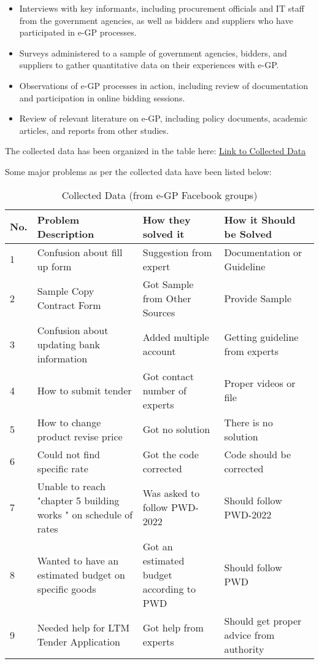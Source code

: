 \documentclass{report}
\begin{document}
\begin{itemize}
    \item Interviews with key informants, including procurement officials and IT staff from the government agencies, as well as bidders and suppliers who have participated in e-GP processes.
    \item Surveys administered to a sample of government agencies, bidders, and suppliers to gather quantitative data on their experiences with e-GP.
    \item Observations of e-GP processes in action, including review of documentation and participation in online bidding sessions.
    \item Review of relevant literature on e-GP, including policy documents, academic articles, and reports from other studies.
\end{itemize}

The collected data has been organized in the table here: 
\href{https://buetedu-my.sharepoint.com/:w:/g/personal/1805118_cse_buet_ac_bd/EYUHmMrHhEhNkSV2H3Ck-2oBmAqpOcPk1AerYMGOfzdDQw?e=oOpmhX}{Link to Collected Data}

Some major problems as per the collected data have been listed below:

\begin{table}[h]
\caption{Collected Data (from e-GP Facebook groups)}
\centering
\begin{tabularx}{\textwidth}{|p{5mm}|X|X|X|}
\hline
No. & Problem Description & How they solved it & How it Should be Solved \\ [0.5ex] 
\hline\hline
1 & Confusion about fill up form & Suggestion from expert & Documentation or Guideline \\ 
\hline
2 & Sample Copy Contract Form & Got Sample from Other Sources & Provide Sample \\
\hline
3 & Confusion about updating bank information & Added multiple account & Getting guideline from experts \\
\hline
4 & How to submit tender & Got contact number of experts & Proper videos or file \\
\hline
5 & How to change product revise price & Got no solution & There is no solution \\
\hline
6 & Could not find specific rate & Got the code corrected & Code should be corrected \\
\hline
7 & Unable to reach "chapter 5 building works " on schedule of rates & Was asked to follow PWD-2022 & Should follow PWD-2022 \\
\hline
8 & Wanted to have an estimated budget on specific goods & Got an estimated budget according to PWD & Should follow PWD \\
\hline
9 & Needed help for LTM Tender Application & Got help from experts & Should get proper advice from authority \\
\hline
\end{tabularx}
\label{table:data}
\end{table}
\end{document}
